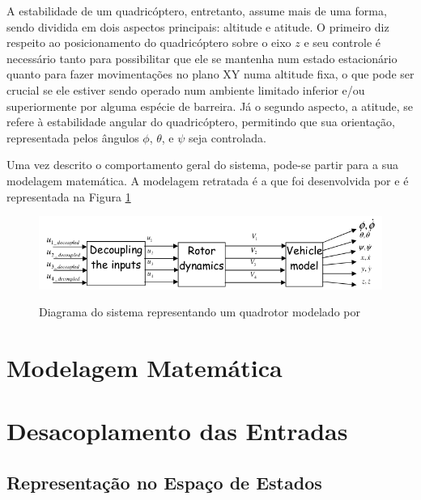 A estabilidade de um quadricóptero, entretanto, assume mais de uma forma, sendo dividida em dois aspectos principais: altitude e atitude. O primeiro diz respeito ao posicionamento do quadricóptero sobre o eixo $z$ e seu controle é necessário tanto para possibilitar que ele se mantenha num estado estacionário quanto para fazer movimentações no plano XY numa altitude fixa, o que pode ser crucial se ele estiver sendo operado num ambiente limitado inferior e/ou superiormente por alguma espécie de barreira. Já o segundo aspecto, a atitude, se refere à estabilidade angular do quadricóptero, permitindo que sua orientação, representada pelos ângulos $\phi$, $\theta$, e $\psi$ seja controlada.

Uma vez descrito o comportamento geral do sistema, pode-se partir para a sua modelagem matemática. A modelagem retratada é a que foi desenvolvida por  e é representada na Figura \ref{fig:diagrama-quadrotor-balas}

\begin{figure}[!htb]
    \centering
    \caption{Diagrama do sistema representando um quadrotor modelado por }
    \includegraphics[width=1\textwidth]{./04-figuras/sistemas-nao-lineares/diagrama-quadrotor}
    \label{fig:diagrama-quadrotor-balas}
\end{figure}

\section{Modelagem Matemática}
\label{sec:dinamica-rotores}



\section{Desacoplamento das Entradas}
\label{sec:desacoplamento}



%
%


\subsection{Representação no Espaço de Estados}
\label{subsec:quadrotor-ss}


